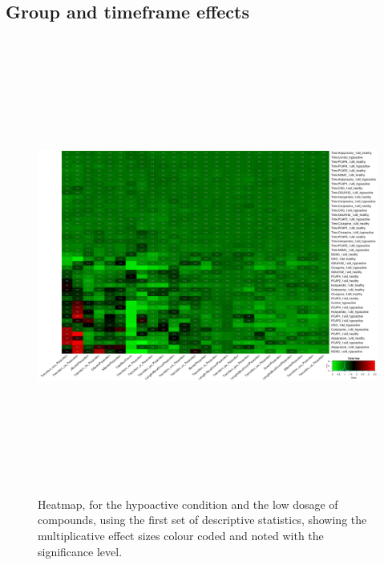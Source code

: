 \documentclass[a4paper,12pt]{article}
\begin{document}
\subsection{Group and timeframe effects}
\begin{figure}[h!]
\begin{center}
\includegraphics[width=16cm,height=15cm]{DarkApoLow_heatmap_1_microM_DarkApoLow_B2MAP.png}
\caption{Heatmap, for the hypoactive condition and the low dosage of compounds, using the first set of descriptive statistics, showing the multiplicative effect sizes colour coded and noted with the significance level.}
\end{center}
\end{figure}
\newpage
\end{document}
